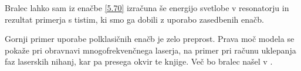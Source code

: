Bralec lahko sam iz enačbe \ref{5.70} izračuna še energijo svetlobe v
resonatorju in rezultat primerja s tistim, ki smo ga dobili z uporabo
zasedbenih enačb.

Gornji primer uporabe polklasičnih enačb je zelo preprost. Prava moč
modela se pokaže pri obravnavi mnogofrekvenčnega laserja, na primer pri
računu uklepanja faz laserskih nihanj, kar pa presega okvir te knjige. Več
bo bralec našel v \cite{haken2}.
